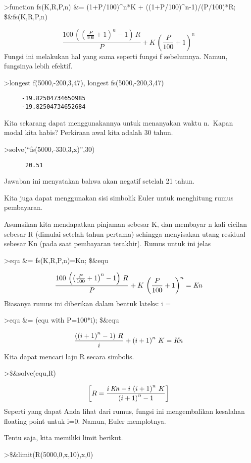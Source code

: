 \documentclass[
]{book}
\begin{document}
\textgreater function fs(K,R,P,n) \&= (1+P/100)\^{}n*K + ((1+P/100)\^{}n-1)/(P/100)*R; \$\&fs(K,R,P,n)

\[\frac{100\,\left(\left(\frac{P}{100}+1\right)^{n}-1\right)\,R}{P}+K \,\left(\frac{P}{100}+1\right)^{n}\]Fungsi ini melakukan hal yang sama seperti fungsi f sebelumnya. Namun, fungsinya lebih efektif.

\textgreater longest f(5000,-200,3,47), longest fs(5000,-200,3,47)

\begin{verbatim}
     -19.82504734650985 
     -19.82504734652684 
\end{verbatim}

Kita sekarang dapat menggunakannya untuk menanyakan waktu n.~Kapan modal kita habis? Perkiraan awal kita adalah 30 tahun.

\textgreater solve(``fs(5000,-330,3,x)'',30)

\begin{verbatim}
      20.51 
\end{verbatim}

Jawaban ini menyatakan bahwa akan negatif setelah 21 tahun.

Kita juga dapat menggunakan sisi simbolik Euler untuk menghitung rumus pembayaran.

Asumsikan kita mendapatkan pinjaman sebesar K, dan membayar n kali cicilan sebesar R (dimulai setelah tahun pertama) sehingga menyisakan utang residual sebesar Kn (pada saat pembayaran terakhir). Rumus untuk ini jelas

\textgreater equ \&= fs(K,R,P,n)=Kn; \$\&equ

\[\frac{100\,\left(\left(\frac{P}{100}+1\right)^{n}-1\right)\,R}{P}+K\,\left(\frac{P}{100}+1\right)^{n}={\it Kn}\]Biasanya rumus ini diberikan dalam bentuk lateks: i = 

\textgreater equ \&= (equ with P=100*i); \$\&equ

\[\frac{\left(\left(i+1\right)^{n}-1\right)\,R}{i}+\left(i+1\right)^{n}\,K={\it Kn}\]Kita dapat mencari laju R secara simbolis.

\textgreater\$\&solve(equ,R)

\[\left[ R=\frac{i\,{\it Kn}-i\,\left(i+1\right)^{n}\,K}{\left(i+1\right)^{n}-1} \right]\]Seperti yang dapat Anda lihat dari rumus, fungsi ini mengembalikan kesalahan floating point untuk i=0. Namun, Euler memplotnya.

Tentu saja, kita memiliki limit berikut.

\textgreater\$\&limit(R(5000,0,x,10),x,0)
\end{document}
